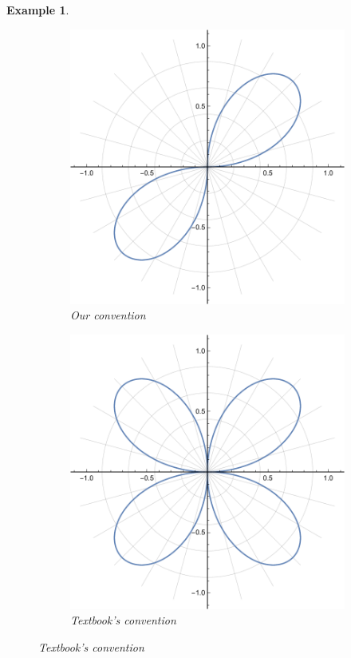 \documentclass[11pt]{amsart}
\newtheorem{example}{Example}[section]
\numberwithin{equation}{section}
\begin{document}
\begin{example}
\begin{figure}
  \begin{subfigure}[b]{0.4\textwidth}
    \includegraphics[width=\textwidth]{polar_p4.pdf}
    \caption{Our convention}
    \label{fig:1}
  \end{subfigure}
  \hfill
  \begin{subfigure}[b]{0.4\textwidth}
    \includegraphics[width=\textwidth]{polar_p5.pdf}
    \caption{Textbook's convention}
    \label{fig:2}
  \end{subfigure}
  \hfill
\end{figure}
\end{example}
\end{document}

